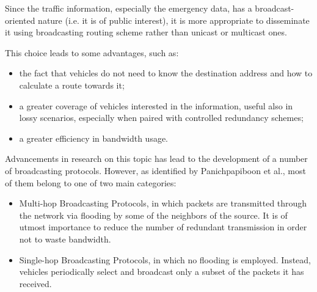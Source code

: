 		
		Since the traffic information, especially the emergency data, has a broadcast-oriented nature (i.e. it is of public interest), it is more appropriate to disseminate it using broadcasting routing scheme rather than unicast or multicast ones. \cite{5989903}
		
		This choice leads to some advantages, such as:
		\begin{itemize}
			\item the fact that vehicles do not need to know the destination address and how to calculate a route towards it;
			\item a greater coverage of vehicles interested in the information, useful also in lossy scenarios, especially when paired with controlled redundancy schemes;
			\item a greater efficiency in bandwidth usage.
		\end{itemize}
		
		Advancements in research on this topic has lead to the development of a number of broadcasting protocols. However, as identified by   Panichpapiboon et al.\cite{5989903}, most of them belong to one of two main categories:
		\begin{itemize}
			\item Multi-hop Broadcasting Protocols, in which packets are transmitted through the network via flooding by some of the neighbors of the source. It is of utmost importance to reduce the number of redundant transmission in order not to waste bandwidth.
			\item Single-hop Broadcasting Protocols, in which no flooding is employed. Instead, vehicles periodically select and broadcast only a subset of the packets it has received.
		\end{itemize}
		
